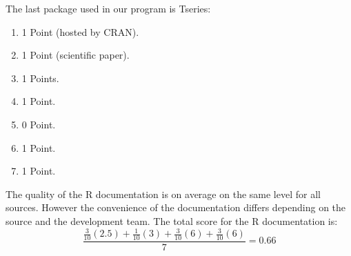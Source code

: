 \documentclass[
  twoside,
  12pt, a4paper,
  footinclude=true,
  headinclude=true,
  cleardoublepage=empty
]{article}
\begin{document}
The last package used in our program is Tseries:
\begin{enumerate}
    \item 1 Point (hosted by CRAN).
    \item 1 Point (scientific paper).
    \item 1 Points.
    \item 1 Point.
    \item 0 Point.
    \item 1 Point.
    \item 1 Point.
\end{enumerate}
The quality of the R documentation is on average on the same level for all sources. However the convenience of the documentation differs depending on the source and the development team. The total score for the R documentation is:
\[ \frac{\frac{3}{10}(2.5)+\frac{1}{10}(3)+\frac{3}{10}(6)+\frac{3}{10}(6)}{7}= 0.66 \] 
\end{document}
